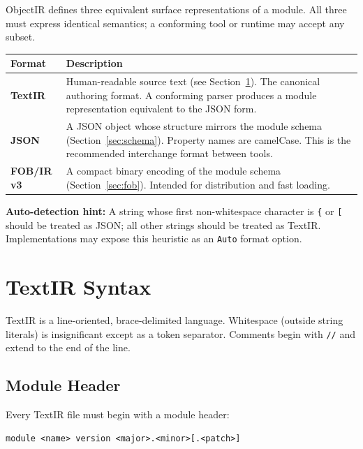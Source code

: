 \documentclass[11pt,a4paper]{article}
\newcommand{\term}[1]{\texttt{#1}}
\begin{document}
ObjectIR defines three equivalent surface representations of a module. All
three must express identical semantics; a conforming tool or runtime may
accept any subset.

\begin{longtable}{lp{10cm}}
  \toprule
  \textbf{Format} & \textbf{Description} \\
  \midrule
  \endhead
  \textbf{TextIR}    &
    Human-readable source text (see Section~\ref{sec:textir}).
    The canonical authoring format. A conforming parser produces a module
    representation equivalent to the JSON form. \\[0.4em]
  \textbf{JSON}      &
    A JSON object whose structure mirrors the module schema
    (Section~\ref{sec:schema}). Property names are camelCase.
    This is the recommended interchange format between tools. \\[0.4em]
  \textbf{FOB/IR v3} &
    A compact binary encoding of the module schema
    (Section~\ref{sec:fob}). Intended for distribution and fast loading. \\
  \bottomrule
\end{longtable}

\begin{notebox}
\textbf{Auto-detection hint:} A string whose first non-whitespace character
is \texttt{\{} or \texttt{[} should be treated as JSON; all other strings
should be treated as TextIR. Implementations may expose this heuristic as
an \texttt{Auto} format option.
\end{notebox}

\section{TextIR Syntax}
\label{sec:textir}

TextIR is a line-oriented, brace-delimited language. Whitespace (outside
string literals) is insignificant except as a token separator. Comments
begin with \term{//} and extend to the end of the line.

\subsection{Module Header}

Every TextIR file must begin with a module header:

\begin{lstlisting}[style=textir]
module <name> version <major>.<minor>[.<patch>]
\end{lstlisting}
\end{document}
